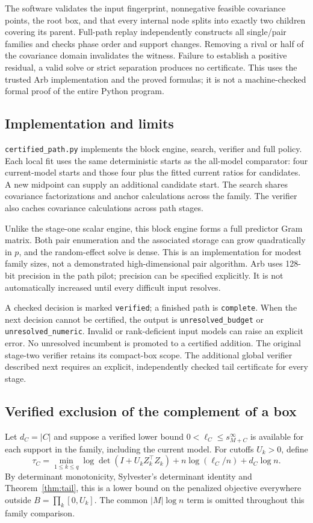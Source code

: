 \documentclass[11pt,a4paper]{article}
\theoremstyle{remark}\newtheorem{remark}[theorem]{Remark}
\begin{document}
The software validates the input fingerprint, nonnegative feasible covariance
points, the root box, and that every internal node splits into exactly two
children covering its parent. Full-path replay independently constructs all
single/pair families and checks phase order and support changes. Removing a
rival or half of the covariance domain invalidates the witness. Failure to
establish a positive residual, a valid solve or strict separation produces no
certificate. This uses the trusted Arb implementation and the proved formulas;
it is not a machine-checked formal proof of the entire Python program.

\subsection{Implementation and limits}
\texttt{certified\_path.py} implements the block engine, search, verifier and full
policy. Each local fit uses the same deterministic starts as the all-model
comparator: four current-model starts and those four plus the fitted current
ratios for candidates. A new midpoint can supply an additional candidate start.
The search shares covariance factorizations and anchor calculations across the
family. The verifier also caches covariance calculations across path stages.

Unlike the stage-one scalar engine, this block engine forms a full predictor
Gram matrix. Both pair enumeration and the associated storage can grow
quadratically in $p$, and the random-effect solve is dense. This is an implementation
for modest family sizes, not a demonstrated high-dimensional pair algorithm.
Arb uses 128-bit precision in the path pilot; precision can be specified explicitly.
It is not automatically increased until every difficult input resolves.

A checked decision is marked \texttt{verified}; a finished path is
\texttt{complete}. When the next decision cannot be certified, the output is
\texttt{unresolved\_budget} or \texttt{unresolved\_numeric}.
Invalid or rank-deficient input models can raise an explicit error. No unresolved
incumbent is promoted to a certified addition. The original stage-two verifier
retains its compact-box scope. The additional global verifier described next
requires an explicit, independently checked tail certificate for every stage.

\subsection{Verified exclusion of the complement of a box}
Let $d_C=|C|$ and suppose a verified lower bound
$0<\ell_C\leq s_{M+C}^{\infty}$ is available for each support in the family,
including the current model. For cutoffs $U_k>0$, define
\begin{equation}\label{eq:verifiedtail}
\tau_C=\min_{1\leq k\leq q}\log\det(I+U_kZ_k^\top Z_k)
       +n\log(\ell_C/n)+d_C\log n.
\end{equation}
By determinant monotonicity, Sylvester's determinant identity and
Theorem~\ref{thm:tail}, this is a lower bound on the penalized objective everywhere
outside $B=\prod_k[0,U_k]$. The common $|M|\log n$ term is omitted throughout
this family comparison.
\end{document}
